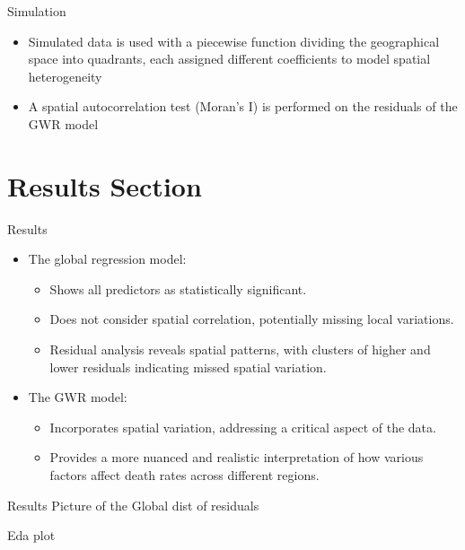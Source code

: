 \documentclass[
  ignorenonframetext,
]{beamer}
\begin{document}
\begin{frame}{Simulation}
\label{simulation}
\begin{itemize}
\item
  Simulated data is used with a piecewise function dividing the
  geographical space into quadrants, each assigned different
  coefficients to model spatial heterogeneity
\item
  A spatial autocorrelation test (Moran's I) is performed on the
  residuals of the GWR model
\end{itemize}
\end{frame}

\section{Results Section}\label{results-section}

\begin{frame}{Results}
\label{results}
\begin{itemize}
\item
  The global regression model:

  \begin{itemize}
  \item
    Shows all predictors as statistically significant.
  \item
    Does not consider spatial correlation, potentially missing local
    variations.
  \item
    Residual analysis reveals spatial patterns, with clusters of higher
    and lower residuals indicating missed spatial variation.
  \end{itemize}
\end{itemize}

\begin{itemize}
\item
  The GWR model:

  \begin{itemize}
  \item
    Incorporates spatial variation, addressing a critical aspect of the
    data.
  \item
    Provides a more nuanced and realistic interpretation of how various
    factors affect death rates across different regions.
  \end{itemize}
\end{itemize}
\end{frame}

\begin{frame}{Results}
\label{results-1}
Picture of the Global dist of residuals

Eda plot
\end{frame}
\end{document}
